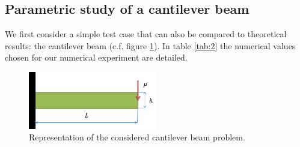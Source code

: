 \subsection{Parametric study of a cantilever beam}
\label{CB}
We first consider a simple test case that can also be compared to theoretical results: the cantilever beam (c.f. figure \ref{fig:cb}).
In table \ref{tab:2} the numerical values chosen for our numerical experiment are detailed.
\begin{figure}[!h]
\centering
  \includegraphics[width=0.5\textwidth]{images/Ch3/Cantilever_beam.png}
\caption{Representation of the considered cantilever beam problem.}
\label{fig:cb}       %
\end{figure}
